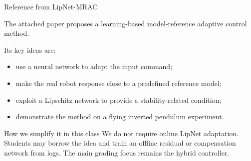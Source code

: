 \documentclass[aspectratio=169]{beamer}
\begin{document}
\begin{frame}{Reference from LipNet-MRAC}

The attached paper proposes a learning-based model-reference adaptive control method.

\vspace{0.15cm}

Its key ideas are:

\begin{itemize}
    \item use a neural network to adapt the input command;
    \vspace{0.12cm}

    \item make the real robot response close to a predefined reference model;
    \vspace{0.12cm}

    \item exploit a Lipschitz network to provide a stability-related condition;
    \vspace{0.12cm}

    \item demonstrate the method on a flying inverted pendulum experiment.
\end{itemize}

\vspace{0.15cm}

\begin{alertblock}{How we simplify it in this class}
\small
We do not require online LipNet adaptation.
Students may borrow the idea and train an offline residual or compensation network from logs.
The main grading focus remains the hybrid controller.
\end{alertblock}

\end{frame}
\end{document}
